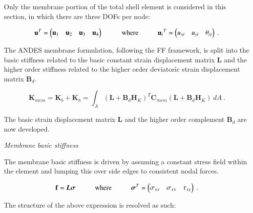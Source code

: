 Only the membrane portion of the total shell element is considered in this section, in which there are three DOFs per node:

\begin{equation} 
\mathbf{u}^T = 
\begin{pmatrix}
\mathbf{u}_1 & \mathbf{u}_2 & \mathbf{u}_3 & \mathbf{u}_4
\end{pmatrix} 
\hspace{10mm}
\text{where}
\hspace{10mm}
\mathbf{u}{_i}^T = 
\begin{pmatrix}
{u_{xi}} & {u_{yi}} & {\theta_{zi}}
\end{pmatrix}
\label{equation04}\ .
\end{equation}

The ANDES membrane formulation, following the FF framework, is split into the basic stiffness related to the basic constant strain displacement matrix $\mathbf{L}$ and the higher order stiffness related to the higher order deviatoric strain displacement matrix $\mathbf{B}_d$.

\begin{equation} 
\mathbf{K}_{mem} = \mathbf{K}_{b} + \mathbf{K}_{h} = \int_A (\mathbf{L} + \mathbf{B}_d  \mathbf{H}_K)^T \mathbf{C}_{mem} (\mathbf{L} + \mathbf{B}_d \mathbf{H}_K)\ dA
\label{equationMEM}\ .
\end{equation}

The basic strain displacement matrix $\mathbf{L}$ and the higher order complement $\mathbf{B}_d$ are now developed. 

\textit{Membrane basic stiffness}

The membrane basic stiffness is driven by assuming a constant stress field within the element and lumping this over side edges to consistent nodal forces. 

\begin{equation} 
\mathbf{f} = \boldsymbol{L\sigma}
\hspace{10mm}
\text{where}
\hspace{10mm}
\boldsymbol{\sigma}^T =
\begin{pmatrix}
\sigma_{xx} & \sigma_{xx} & \tau_{xy}
\end{pmatrix}
\label{equation05}\ .
\end{equation}

The structure of the above expression is resolved as such: 

